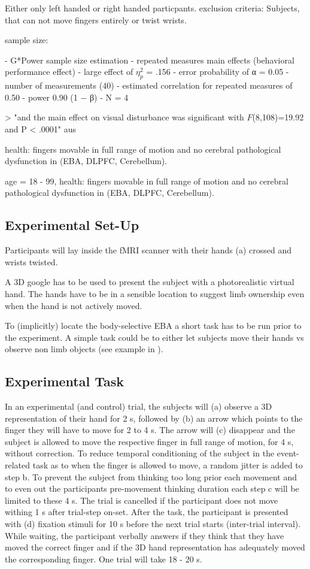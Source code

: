 \documentclass[man]{apa7}
\begin{document}
Either only left handed or right handed particpants.
exclusion criteria: Subjects, that can not move fingers entirely or twist wrists.

sample size:

- G*Power sample size estimation
- repeated measures main effects (behavioral performance effect)
- large effect of $\eta^2_p$ = .156
- error probability of α = 0.05
- number of measurements (40)
- estimated correlation for repeated measures of 0.50
- power 0.90 (1 − β)
- N = 4

> "and the main effect on visual disturbance was significant with $F$(8,108)=19.92 and P < .0001"
aus \parencite{Wei2009}


health: fingers movable in full range of motion and no cerebral pathological dysfunction in (EBA, DLPFC, Cerebellum).

age = 18 - 99, health: fingers movable in full range of motion and no cerebral pathological dysfunction in (EBA, DLPFC, Cerebellum).



\subsection{Experimental Set-Up}

Participants will lay inside the fMRI scanner with their hands (a) crossed and wrists twisted.

A 3D google has to be used to present the subject with a photorealistic virtual hand. The hands have to be in a sensible location to suggest limb ownership even when the hand is not actively moved.

To (implicitly) locate the body-selective EBA a short task has to be run prior to the experiment. A simple task could be to either let subjects move their hands vs observe non limb objects (see example in \cite{Limanowski2016}).

\subsection{Experimental Task}

In an experimental (and control) trial, the subjects will (a) observe a 3D representation of their hand for 2 s, followed by (b) an arrow which points to the finger they will have to move for 2 to 4 s. The arrow will (c) disappear and the subject is allowed to move the respective finger in full range of motion, for 4 s, without correction. To reduce temporal conditioning of the subject in the event-related task as to when the finger is allowed to move, a random jitter is added to step b. To prevent the subject from thinking too long prior each movement and to even out the participants pre-movement thinking duration each step c will be limited to these 4 s. The trial is cancelled if the participant does not move withing 1 s after trial-step on-set. After the task, the participant is presented with (d) fixation stimuli for 10 s before the next trial starts (inter-trial interval). While waiting, the participant verbally answers if they think that they have moved the correct finger and if the 3D hand representation has adequately moved the corresponding finger. One trial will take 18 - 20 s.
\end{document}
